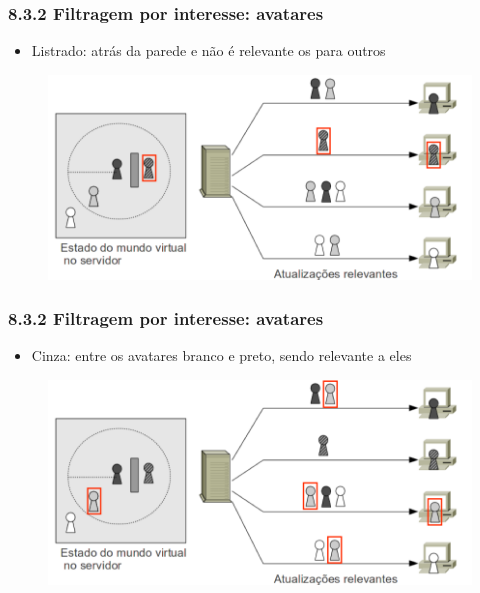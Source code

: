 \documentclass{beamer}
\begin{document}
\begin{frame} 
  \frametitle{8.3.2 Filtragem por interesse: avatares}
  \begin{itemize}
    \item Listrado: atrás da parede e não é relevante os para outros
  \end{itemize}
  \begin{figure}[h]
    \centering
    \vspace{-18pt}
    \includegraphics[width=1.03\textwidth]{imagem_82_Listrado.png}
    \vspace{-20pt}
  \end{figure}
\end{frame}

\begin{frame} 
  \frametitle{8.3.2 Filtragem por interesse: avatares}
  \begin{itemize}
    \item Cinza: entre os avatares branco e preto, sendo relevante a eles
  \end{itemize}
  \begin{figure}[h]
    \centering
    \vspace{-18pt}
    \includegraphics[width=1.03\textwidth]{imagem_82_Cinza.png}
    \vspace{-20pt}
  \end{figure}
\end{frame}
\end{document}

